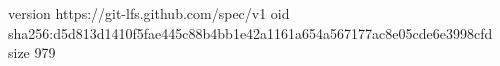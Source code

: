version https://git-lfs.github.com/spec/v1
oid sha256:d5d813d1410f5fae445c88b4bb1e42a1161a654a567177ac8e05cde6e3998cfd
size 979
